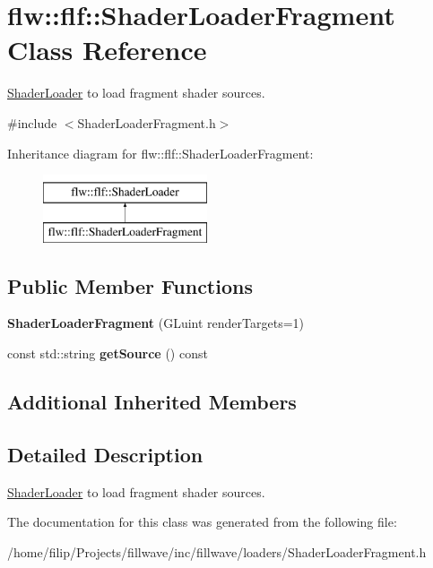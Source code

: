 \hypertarget{classflw_1_1flf_1_1ShaderLoaderFragment}{}\section{flw\+:\+:flf\+:\+:Shader\+Loader\+Fragment Class Reference}
\label{classflw_1_1flf_1_1ShaderLoaderFragment}


\hyperlink{classflw_1_1flf_1_1ShaderLoader}{Shader\+Loader} to load fragment shader sources.  




{\ttfamily \#include $<$Shader\+Loader\+Fragment.\+h$>$}

Inheritance diagram for flw\+:\+:flf\+:\+:Shader\+Loader\+Fragment\+:\begin{figure}[H]
\begin{center}
\leavevmode
\includegraphics[height=2.000000cm]{classflw_1_1flf_1_1ShaderLoaderFragment}
\end{center}
\end{figure}
\subsection*{Public Member Functions}
\begin{DoxyCompactItemize}
\item 
{\bfseries Shader\+Loader\+Fragment} (G\+Luint render\+Targets=1)\hypertarget{classflw_1_1flf_1_1ShaderLoaderFragment_a704f11482f3d215825568b1aeab12a90}{}\label{classflw_1_1flf_1_1ShaderLoaderFragment_a704f11482f3d215825568b1aeab12a90}

\item 
const std\+::string {\bfseries get\+Source} () const \hypertarget{classflw_1_1flf_1_1ShaderLoaderFragment_ac57cf970d0a12eb749b90348a8748a04}{}\label{classflw_1_1flf_1_1ShaderLoaderFragment_ac57cf970d0a12eb749b90348a8748a04}

\end{DoxyCompactItemize}
\subsection*{Additional Inherited Members}


\subsection{Detailed Description}
\hyperlink{classflw_1_1flf_1_1ShaderLoader}{Shader\+Loader} to load fragment shader sources. 

The documentation for this class was generated from the following file\+:\begin{DoxyCompactItemize}
\item 
/home/filip/\+Projects/fillwave/inc/fillwave/loaders/Shader\+Loader\+Fragment.\+h\end{DoxyCompactItemize}
